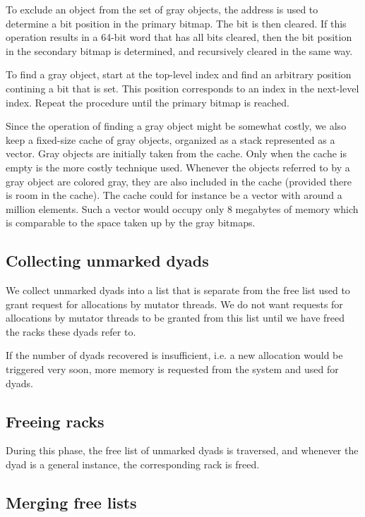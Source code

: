 To exclude an object from the set of gray objects, the address is used
to determine a bit position in the primary bitmap. The bit is then
cleared.  If this operation results in a 64-bit word that has all bits 
cleared, then the bit position in the
secondary bitmap is determined, and recursively cleared in the same
way.

To find a gray object, start at the top-level index and find an
arbitrary position contining a bit that is set.  This position
corresponds to an index in the next-level index.  Repeat the procedure
until the primary bitmap is reached.

Since the operation of finding a gray object might be somewhat costly,
we also keep a fixed-size cache of gray objects, organized as a stack
represented as a vector.  Gray objects are initially taken from the
cache.  Only when the cache is empty is the more costly technique
used.  Whenever the objects referred to by a gray object are colored
gray, they are also included in the cache (provided there is room in
the cache).  The cache could for instance be a vector with around a
million elements.  Such a vector would occupy only 8 megabytes of
memory which is comparable to the space taken up by the gray bitmaps.


\subsection{Collecting unmarked dyads}

We collect unmarked dyads into a list that is separate from the free
list used to grant request for allocations by mutator threads.  We do
not want requests for allocations by mutator threads to be granted
from this list until we have freed the racks these dyads refer to.

If the number of dyads recovered is insufficient, i.e. a new
allocation would be triggered very soon, more memory is requested from
the system and used for dyads.

\subsection{Freeing racks}

During this phase, the free list of unmarked dyads is traversed, and
whenever the dyad is a general instance, the corresponding rack is
freed.

\subsection{Merging free lists}


